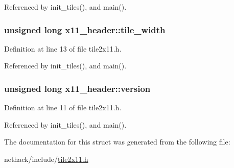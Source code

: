 Referenced by init\+\_\+tiles(), and main().

\hypertarget{structx11__header_a7d80edb8d769660ce1149ffe41113e4e}{
\subsubsection[{tile\+\_\+width}]{\setlength{\rightskip}{0pt plus 5cm}unsigned long x11\+\_\+header\+::tile\+\_\+width}}\label{structx11__header_a7d80edb8d769660ce1149ffe41113e4e}


Definition at line 13 of file tile2x11.\+h.



Referenced by init\+\_\+tiles(), and main().

\hypertarget{structx11__header_afeb200c99dc3b2fd297b209c8ad9dd8d}{
\subsubsection[{version}]{\setlength{\rightskip}{0pt plus 5cm}unsigned long x11\+\_\+header\+::version}}\label{structx11__header_afeb200c99dc3b2fd297b209c8ad9dd8d}


Definition at line 11 of file tile2x11.\+h.



Referenced by init\+\_\+tiles(), and main().



The documentation for this struct was generated from the following file\+:\begin{DoxyCompactItemize}
\item 
nethack/include/\hyperlink{tile2x11_8h}{tile2x11.\+h}\end{DoxyCompactItemize}
